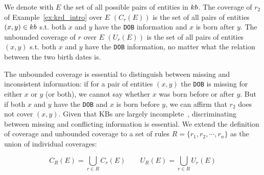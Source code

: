 \begin{example}
	We denote with $E$ the set of all possible pairs of entities in ${\sc kb}$. The coverage of $r_2$ of Example~\ref{ex:krd_intro} over $E$ $(C_r(E))$ is the set of all pairs of entities $(x,y) \in {\sc kb}$ s.t. both $x$ and $y$ have the \texttt{DOB} information and $x$ is born after $y$. The unbounded coverage of $r$ over $E$ $(U_r(E))$ is the set of all pairs of entities $(x,y)$ s.t. both $x$ and $y$ have the \texttt{DOB} information, no matter what the relation between the two birth dates is. 
\end{example} 

The unbounded coverage is essential to distinguish between missing and inconsistent information: if for a pair of entities $(x,y)$ the \texttt{DOB} is missing for either $x$ or $y$ (or both), we cannot say whether $x$ was born before or after $y$. 
But if both $x$ and $y$ have the \texttt{DOB} and $x$ is born before $y$, we can affirm that $r_2$ does not cover $(x,y)$. Given that KBs are largely incomplete~\cite{min2013distant}, discriminating between missing and conflicting information is %
 essential.
%
We extend the definition of coverage and unbounded coverage to a set of rules $R=\{r_1,r_2,\cdots,r_n\}$ as the union of individual coverages:

\begin{equation*}
	C_R(E) = \bigcup \limits_{r \in R} C_r(E) \qquad U_R(E) = \bigcup \limits_{r \in R} U_r(E) 	\end{equation*}
\vspace{-3mm}


